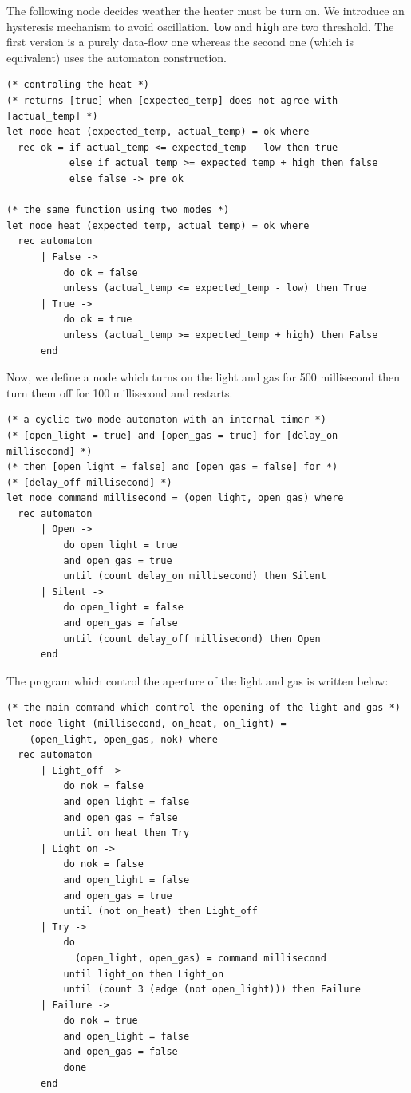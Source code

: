 \documentclass[11pt,titlepage,twoside]{report}
\begin{document}
The following node decides weather the heater must be turn on. We introduce
an hysteresis mechanism to avoid oscillation. \verb-low- and \verb-high- are
two threshold. The first version is a purely data-flow one whereas the
second one (which is equivalent) uses the automaton construction.

\begin{verbatim}
(* controling the heat *)
(* returns [true] when [expected_temp] does not agree with [actual_temp] *)
let node heat (expected_temp, actual_temp) = ok where
  rec ok = if actual_temp <= expected_temp - low then true
           else if actual_temp >= expected_temp + high then false
           else false -> pre ok

(* the same function using two modes *)
let node heat (expected_temp, actual_temp) = ok where
  rec automaton
      | False -> 
          do ok = false 
          unless (actual_temp <= expected_temp - low) then True
      | True ->
          do ok = true 
          unless (actual_temp >= expected_temp + high) then False
      end
\end{verbatim}

Now, we define a node which turns on the light and gas for 500 millisecond
then turn them off for 100 millisecond and restarts.

\begin{verbatim}
(* a cyclic two mode automaton with an internal timer *)
(* [open_light = true] and [open_gas = true] for [delay_on millisecond] *)
(* then [open_light = false] and [open_gas = false] for *)
(* [delay_off millisecond] *)
let node command millisecond = (open_light, open_gas) where
  rec automaton
      | Open ->
          do open_light = true
          and open_gas = true
          until (count delay_on millisecond) then Silent
      | Silent ->
          do open_light = false
          and open_gas = false
          until (count delay_off millisecond) then Open
      end
\end{verbatim}

The program which control the aperture of the light and
gas is written below:

\begin{verbatim}
(* the main command which control the opening of the light and gas *)
let node light (millisecond, on_heat, on_light) = 
    (open_light, open_gas, nok) where
  rec automaton
      | Light_off ->
          do nok = false
          and open_light = false
          and open_gas = false
          until on_heat then Try
      | Light_on ->
          do nok = false
          and open_light = false
          and open_gas = true
          until (not on_heat) then Light_off
      | Try ->
          do
            (open_light, open_gas) = command millisecond
          until light_on then Light_on
          until (count 3 (edge (not open_light))) then Failure
      | Failure ->
          do nok = true 
          and open_light = false
          and open_gas = false
          done
      end
\end{verbatim}
\end{document}
